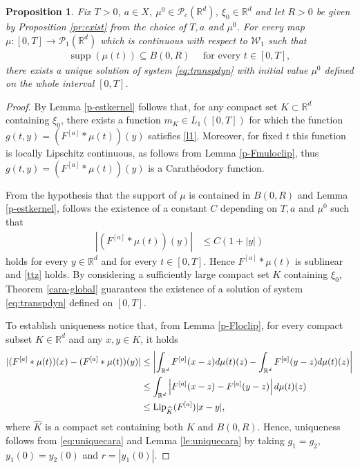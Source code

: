 \documentclass[A4paper,11pt]{article}
\newtheorem{proposition}[theorem]{Proposition}
\theoremstyle{definition}
\newcommand{\Lip}{\textup{Lip}}
\newcommand{\loc}{\textup{loc}}
\newcommand{\R}{\mathbb{R}}
\newcommand{\W}{\mathcal{W}}
\newcommand{\PP}{\mathcal{P}_1}
\DeclareMathOperator{\supp}{supp}
\newcommand{\Fun}[1]{F^{[#1]}}
\begin{document}
\begin{proposition}
Fix $T > 0$, $a \in X$, $\mu^0 \in \mathcal{P}_c(\R^d)$, $\xi_0 \in \R^d$ and let $R > 0$ be given by Proposition \ref{pr:exist} from the choice of $T, a$ and $\mu^0$. For every map $\mu:[0,T] \rightarrow \PP(\R^d)$ which is continuous with respect to $\W_1$ such that
\begin{align*}
\supp(\mu(t)) \subseteq B(0,R) \quad \text{ for every } t \in [0,T],
\end{align*}
there exists a unique solution of system \eqref{eq:transpdyn} with initial value $\mu^0$ defined on the whole interval $[0,T]$.
\end{proposition}
\begin{proof}
By Lemma \ref{p-estkernel} follows that, for any compact set $K \subset \R^d$ containing $\xi_0$, there exists a function $m_K \in L_1([0,T])$ for which the function $g(t,y)=(\Fun{a}\ast\mu(t))(y)$ satisfies \eqref{l1}. Moreover, for fixed $t$ this function is locally Lipschitz continuous, as follows from Lemma \ref{p-Fmuloclip}, thus $g(t,y)=(\Fun{a}\ast\mu(t))(y)$ is a Carath\'eodory function.

		
From the hypothesis that the support of $\mu$ is contained in $B(0,R)$ and Lemma \ref{p-estkernel}, follows the existence of a constant $C$ depending on $T,a$ and $\mu^0$ such that
\begin{align*}
|(\Fun{a}*\mu(t))(y)| &\leq C(1+|y|)
\end{align*}
holds for every $y \in \R^d$ and for every $t \in [0,T]$. Hence $\Fun{a}*\mu(t)$ is sublinear and \eqref{ttz} holds. By considering a sufficiently large compact set $K$ containing $\xi_0$, Theorem \ref{cara-global} guarantees the existence of a solution of system \eqref{eq:transpdyn} defined on $[0,T]$.

To establish uniqueness notice that, from Lemma \ref{p-Floclip}, for every compact subset $K \in \R^d$ and any $x,y \in K$, it holds
\begin{align}
\begin{split}\label{eq:uniquecara}
|(\Fun{a}*\mu(t))(x) - (\Fun{a}*\mu(t))(y)| &\leq \left| \int_{\R^d}\Fun{a}(x-z)d\mu(t)(z) - \int_{\R^d}\Fun{a}(y-z)d\mu(t)(z)\right| \\
&\leq \int_{\R^d} \left|\Fun{a}(x-z) - \Fun{a}(y-z)\right|d\mu(t)(z) \\
&\leq \Lip_{\widehat{K}}(\Fun{a}) |x-y|,
\end{split}\end{align}
where $\widehat{K}$ is a compact set containing both $K$ and $B(0,R)$. Hence, uniqueness follows from \eqref{eq:uniquecara} and Lemma \ref{le:uniquecara} by taking $g_1 = g_2$, $y_1(0) = y_2(0)$ and $r = |y_1(0)|$.
\end{proof}
\end{document}
